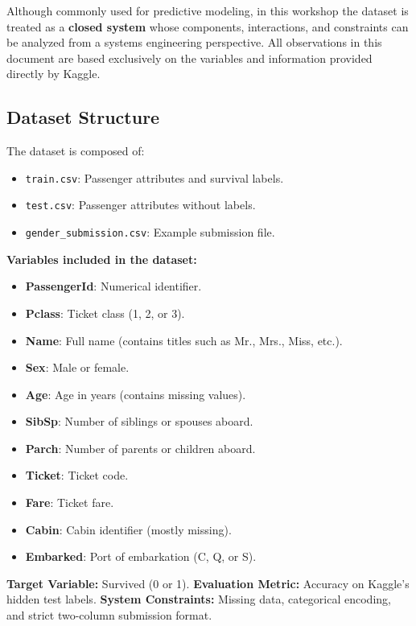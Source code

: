 \documentclass[12pt]{report}
\begin{document}
Although commonly used for predictive modeling, in this workshop the dataset is treated as a \textbf{closed system} whose components, interactions, and constraints can be analyzed from a systems engineering perspective. All observations in this document are based exclusively on the variables and information provided directly by Kaggle.

\subsection*{Dataset Structure}

The dataset is composed of:

\begin{itemize}
    \item \texttt{train.csv}: Passenger attributes and survival labels.
    \item \texttt{test.csv}: Passenger attributes without labels.
    \item \texttt{gender\_submission.csv}: Example submission file.
\end{itemize}

\noindent
\textbf{Variables included in the dataset:}
\begin{itemize}
    \item \textbf{PassengerId}: Numerical identifier.
    \item \textbf{Pclass}: Ticket class (1, 2, or 3).
    \item \textbf{Name}: Full name (contains titles such as Mr., Mrs., Miss, etc.).
    \item \textbf{Sex}: Male or female.
    \item \textbf{Age}: Age in years (contains missing values).
    \item \textbf{SibSp}: Number of siblings or spouses aboard.
    \item \textbf{Parch}: Number of parents or children aboard.
    \item \textbf{Ticket}: Ticket code.
    \item \textbf{Fare}: Ticket fare.
    \item \textbf{Cabin}: Cabin identifier (mostly missing).
    \item \textbf{Embarked}: Port of embarkation (C, Q, or S).
\end{itemize}

\noindent
\textbf{Target Variable:} Survived (0 or 1).  
\textbf{Evaluation Metric:} Accuracy on Kaggle’s hidden test labels.  
\textbf{System Constraints:} Missing data, categorical encoding, and strict two-column submission format.
\end{document}
